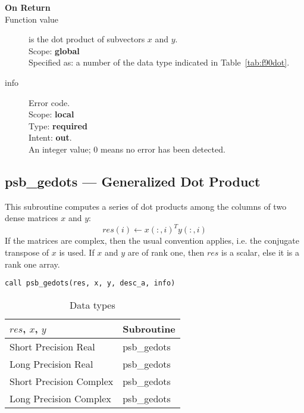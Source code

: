 \begin{description}
\item[\bf On Return] 
\item[Function value] is the dot product of subvectors $x$ and $y$.\\
Scope: {\bf global} \\
Specified as: a number of the data type indicated in Table~\ref{tab:f90dot}.
\item[info] Error code.\\
Scope: {\bf local} \\
Type: {\bf required} \\
Intent: {\bf out}.\\
An integer value; 0 means no error has been detected. 
\end{description}
%
%

\clearpage\subsection*{psb\_gedots --- Generalized Dot Product}

This subroutine computes a series of  dot products among the columns of
two dense matrices  $x$ and $y$: 
\[ res(i) \leftarrow x(:,i)^T y(:,i)\]
If the matrices are complex, then the
usual convention applies, i.e. the conjugate transpose of $x$ is
used. If $x$ and $y$ are of rank one, then $res$ is a scalar, else it
is a rank one array. 

\begin{verbatim}
call psb_gedots(res, x, y, desc_a, info)
\end{verbatim}
\begin{table}[h]
\begin{center}
\begin{tabular}{ll}
\hline
$res$, $x$, $y$ & {\bf Subroutine}\\
\hline
Short Precision Real & psb\_gedots \\
Long Precision Real & psb\_gedots \\
Short Precision Complex & psb\_gedots \\	
Long Precision Complex & psb\_gedots \\	
\hline
\end{tabular}
\end{center}
\caption{Data types\label{tab:f90mdot}}
\end{table}

